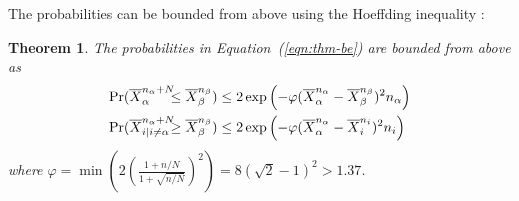 \documentclass[]{article}
\newtheorem{thm}{Theorem}
\renewcommand{\eqref}[1]{Equation~(\ref{#1})}
\begin{document}
The probabilities can be bounded from above using the
Hoeffding inequality \citep{Hoeffding.ineq}:
\begin{thm} The probabilities in \eqref{eqn:thm-be} are bounded from above as
\begin{align}
  \label{eqn:probound-blnk-hoeffding}
  \Pr&(\overline X_\alpha^{{n_\alpha}+N}\hspace{-6pt} \le \overline X_\beta^{n_\beta})
  \le 2\exp\left(- \varphi (\overline X_\alpha^{n_\alpha} - \overline X_\beta^{n_\beta})^2 n_\alpha
  \right)\nonumber\\
  \Pr&(\overline X_{i|i\ne\alpha}^{n_\alpha+N}\hspace{-6pt} \ge \overline X_\beta^{n_\beta})
  \le 2\exp\left(- \varphi (\overline X_\alpha^{n_\alpha} -\overline  X_i^{n_i})^2 n_i \right)\hspace{-6pt}
\end{align}
where $\varphi=\min \left(2(\frac {1+n/N} {1+\sqrt {n/N}})^2\right)=8(\sqrt 2 - 1)^2 > 1.37$.
\label{thm:hoeffding-prob-bounds}
\end{thm}
\end{document}
